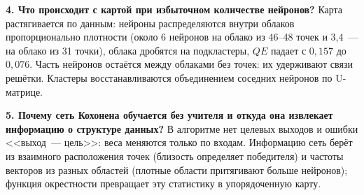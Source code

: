 \documentclass[14pt,a4paper]{extarticle}
\begin{document}
\textbf{4. Что происходит с картой при избыточном количестве нейронов?} Карта растягивается по данным: нейроны распределяются внутри облаков пропорционально плотности (около 6 нейронов на облако из 46--48 точек и 3,4~--- на облако из 31 точки), облака дробятся на подкластеры, $QE$ падает с $0{,}157$ до $0{,}076$. Часть нейронов остаётся между облаками без точек: их удерживают связи решётки. Кластеры восстанавливаются объединением соседних нейронов по U-матрице.

\textbf{5. Почему сеть Кохонена обучается без учителя и откуда она извлекает информацию о структуре данных?} В алгоритме нет целевых выходов и ошибки <<выход~--- цель>>: веса меняются только по входам. Информацию сеть берёт из взаимного расположения точек (близость определяет победителя) и частоты векторов из разных областей (плотные области притягивают больше нейронов); функция окрестности превращает эту статистику в упорядоченную карту.
\end{document}
